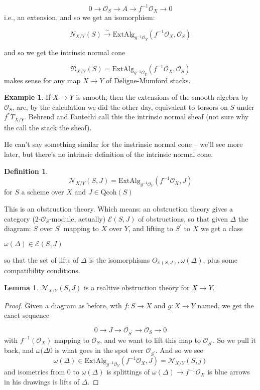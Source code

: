 \documentclass{amsart}
\theoremstyle{definition}
\newtheorem{definition}[dummy]{Definition}
\newtheorem{example}[dummy]{Example}
\newtheorem{lemma}[dummy]{Lemma}
\newcommand{\OO}{\mathcal{O}}
\begin{document}
$$0\to \OO_S\to A\to f^{-1}\OO_X\to 0$$
i.e., an extension, and so we get an isomorphism:

$$N_{X/Y}(S)\stackrel{\sim}\to \text{ExtAlg}_{g^{-1}\OO_Y}(f^{-1}\OO_X,\OO_S)$$

and so we get the intrinsic normal cone

$$\mathfrak{N}_{X/Y}(S)=\text{ExtAlg}_{g^{-1}\OO_Y}(f^{-1}\OO_X,\OO_S)$$
makes sense for any map $X\to Y$ of Deligne-Mumford stacks.

\begin{example}
If $X\to Y$ is smooth, then the extensions of the smooth algebra by $\OO_S$, are, by the calculation we did the other day, equivalent to torsors on $S$ under $f^*T_{X/Y}$.  Behrend and Fantechi call this the intrinsic normal sheaf (not sure why the call the stack the sheaf). 

\end{example}

He can't say something similar for the instrinsic normal cone -- we'll see more later, but there's no intrinsic definition of the intrinsic normal cone.

\begin{definition}
$$\mathcal{N}_{X/Y}(S,J)=\text{ExtAlg}_{g^{-1}\OO_Y}(f^{-1}\OO_X, J)$$
for $S$ a scheme over $X$ and $J\in\text{Qcoh}(S)$
\end{definition}

This is an obstruction theory.  Which means: an obstruction theory gives a category (2-$\OO_S$-module, actually) $\mathcal{E}(S,J)$ of obstructions, so that given $\Delta$ the diagram: $S$ over $S^\prime$ mapping to $X$ over $Y$, and lifting to $S^\prime$ to $X$ we get a class

$\omega(\Delta)\in\mathcal{E}(S,J)$

so that the set of lifts of $\Delta$ is the isomorphisms $O_{\mathcal{E}(S,J)},\omega(\Delta)$, plus some compatibility conditions.


\begin{lemma}
$\mathcal{N}_{X/Y}(S,J)$ is a realtive obstruction theory for $X\to Y$.
\end{lemma}

\begin{proof}
Given a diagram as before, wth $f:S\to X$ and $g:X\to Y$ named, we get the exact sequence

$$0\to J\to \OO_{S^\prime}\to \OO_S\to 0$$
with $f^{-1}(\OO_X)$ mapping to $\OO_S$, and we want to lift this map to $\OO_{S^\prime}$.
So we pull it back, and $\omega(\Delta0$ is what goes in the spot over $\OO_{S^\prime}$.
And so we see 
$$\omega(\Delta)\in\text{ExtAlg}_{g^{-1}\OO_Y} (f^{-1}\OO_X, J)=\mathcal{N}_{X/Y}(S,j)$$
and isometries from $0$ to $\omega(\Delta)$ is splittings of $\omega(\Delta)\to f^{-1}\OO_X$ is blue arrows in his drawings is lifts of $\Delta$.
\end{proof}
\end{document}
